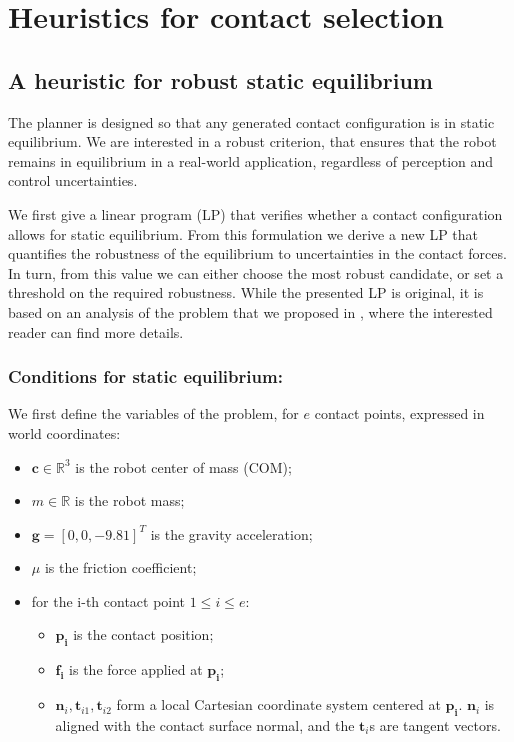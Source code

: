 \section{Heuristics for contact selection}
\label{sec:heuristics}
\subsection{A heuristic for robust static equilibrium}
The planner is designed so that any generated contact configuration is in static equilibrium.
We are interested in a robust 
criterion, that ensures that the robot remains in equilibrium in a real-world application, regardless of perception and control uncertainties.

We first give a linear program (LP) that verifies whether a contact configuration allows for static equilibrium.
From this formulation we derive a new LP that quantifies the robustness of the equilibrium to uncertainties in the contact forces.
In turn, from this value we can either choose the most robust candidate, or set a threshold on the required robustness. While the presented LP is original, it is based on an analysis of the problem that we proposed in \citep{Prete2016}, where the interested reader can find more details.


\subsubsection{Conditions for static equilibrium:}
We first define the variables of the problem, for $e$ contact points, expressed in world coordinates:
\begin{itemize}
\item $\mathbf{c} \in \mathbb{R}^3$ is the robot center of mass (COM);
\item $m \in \mathbb{R}$ is the robot mass;
\item $\mathbf{g} = [0,0,-9.81]^T$ is the gravity acceleration;
\item $\mu$ is the friction coefficient;
\item for the i-th contact point $1 \leq i \leq e$:
	\begin{itemize}
	\item $\mathbf{p_i}$ is the contact position;
	\item $\mathbf{f_i}$ is the force applied at $\mathbf{p_i}$;
	\item $\mathbf{n}_i,\mathbf{t}_{i1},\mathbf{t}_{i2}$ form a local Cartesian coordinate system centered at $\mathbf{p_i}$. $\mathbf{n}_i$ is aligned
	with the contact surface normal, and the $\mathbf{t}_i$s are tangent vectors.
	\end{itemize}
\end{itemize}


